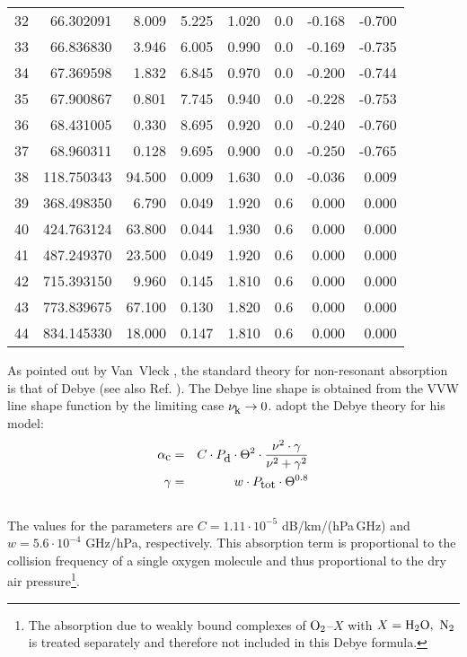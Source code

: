 {\begin{longtable}{lrrrrrrr}
32 & 66.302091 &   8.009 &  5.225 &    1.020 & 0.0 &  -0.168 &   -0.700\\
33 & 66.836830 &   3.946 &  6.005 &    0.990 & 0.0 &  -0.169 &   -0.735\\
34 & 67.369598 &   1.832 &  6.845 &    0.970 & 0.0 &  -0.200 &   -0.744\\
35 & 67.900867 &   0.801 &  7.745 &    0.940 & 0.0 &  -0.228 &   -0.753\\
36 & 68.431005 &   0.330 &  8.695 &    0.920 & 0.0 &  -0.240 &   -0.760\\
37 & 68.960311 &   0.128 &  9.695 &    0.900 & 0.0 &  -0.250 &   -0.765\\
38 & 118.750343 &  94.500 &  0.009 &   1.630 & 0.0 &  -0.036 &    0.009\\
39 & 368.498350 &   6.790 &  0.049 &   1.920 & 0.6 &   0.000 &    0.000\\
40 & 424.763124 &  63.800 &  0.044 &   1.930 & 0.6 &   0.000 &    0.000\\
41 & 487.249370 &  23.500 &  0.049 &   1.920 & 0.6 &   0.000 &    0.000\\
42 & 715.393150 &   9.960 &  0.145 &   1.810 & 0.6 &   0.000 &    0.000\\
43 & 773.839675 &  67.100 &  0.130 &   1.820 & 0.6 &   0.000 &    0.000\\
44 & 834.145330 &  18.000 &  0.147 &   1.810 & 0.6 &   0.000 &    0.000\\
\end{longtable}

\label{levele:mpm93_o2cont}
As pointed out by Van~Vleck \cite{vv:87}, the standard theory for
non-resonant absorption is that of Debye (see also Ref. \cite{townes:55}). 
The Debye line shape is obtained from the VVW line shape function 
by the limiting case $\nu_{\mbox{\rm \small k}} \rightarrow 0$.
\cite{liebeetal:93} adopt the Debye theory for his model:
\begin{eqnarray}
  \label{eq:mpm93_o2cont}
  \alphac &=&  C \cdot \pda \cdot \Theta^2 \cdot 
               \frac{\nu^2 \cdot \gamma}{\nu^2+\gamma^2}\\
%
  \label{eq:mpm93_o2cont_1}
  \gamma  &=&  w \cdot \ptot \cdot \Theta^{0.8}\nonumber\\
\nonumber
\end{eqnarray}
The values for the parameters are $C = 1.11\cdot 10^{-5}$ dB/km/(hPa\,GHz) and 
$w = 5.6 \cdot 10^{-4}$ GHz/hPa, respectively. This absorption
term is proportional to the collision frequency of a single oxygen molecule
and thus proportional to the dry air pressure\footnote{The absorption
  due to weakly bound complexes of $\mbox{O}_2$--$X$ with $X=\mbox{H}_2\mbox{O},~\mbox{N}_2$ is 
  treated separately and therefore not included in this Debye
  formula.}.




}
